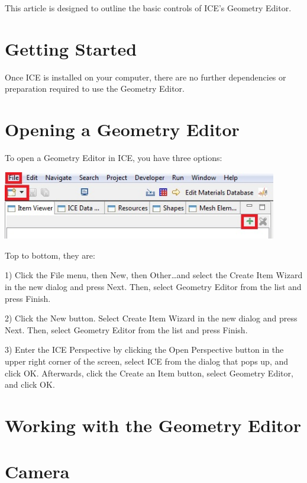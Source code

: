 This article is designed to outline the basic controls of ICE's Geometry Editor.

\section{Getting Started}

Once ICE is installed on your computer, there are no further dependencies or
preparation required to use the Geometry Editor.

\section{Opening a Geometry Editor}

To open a Geometry Editor in ICE, you have three options:

\begin{center}
\includegraphics[width=12cm]{images/CreateNewGeometryOptions.jpg}
\end{center}

Top to bottom, they are:

1) Click the File menu, then New, then Other\ldots and select the Create Item
Wizard in the new dialog and press Next. Then, select Geometry Editor from the
list and press Finish.

 
2) Click the New button. Select Create Item Wizard in the new dialog and
press Next. Then, select Geometry Editor from the list and press Finish.


3) Enter the ICE Perspective by clicking the Open Perspective button in the
upper right corner of the screen, select ICE from the dialog that pops up, and
click OK. Afterwards, click the Create an Item button, select Geometry Editor,
and click OK.

\section{Working with the Geometry Editor}

\section{Camera}

